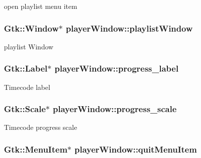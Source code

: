 open playlist menu item \hypertarget{classplayerWindow_a63e7618098364d24ddb947674414b843}{
\subsubsection[{playlist\-Window}]{\setlength{\rightskip}{0pt plus 5cm}Gtk\-::\-Window$\ast$ player\-Window\-::playlist\-Window\hspace{0.3cm}{\ttfamily [protected]}}}\label{classplayerWindow_a63e7618098364d24ddb947674414b843}
playlist Window \hypertarget{classplayerWindow_ae276969a34d7a21553c23ae17ca76eca}{
\subsubsection[{progress\-\_\-label}]{\setlength{\rightskip}{0pt plus 5cm}Gtk\-::\-Label$\ast$ player\-Window\-::progress\-\_\-label\hspace{0.3cm}{\ttfamily [protected]}}}\label{classplayerWindow_ae276969a34d7a21553c23ae17ca76eca}
Timecode label \hypertarget{classplayerWindow_a295a659d7e32496d0fc278afeed2f7d1}{
\subsubsection[{progress\-\_\-scale}]{\setlength{\rightskip}{0pt plus 5cm}Gtk\-::\-Scale$\ast$ player\-Window\-::progress\-\_\-scale\hspace{0.3cm}{\ttfamily [protected]}}}\label{classplayerWindow_a295a659d7e32496d0fc278afeed2f7d1}
Timecode progress scale \hypertarget{classplayerWindow_a8b0c945e5b9aa8c33f1eaaa1a53f79bc}{
\subsubsection[{quit\-Menu\-Item}]{\setlength{\rightskip}{0pt plus 5cm}Gtk\-::\-Menu\-Item$\ast$ player\-Window\-::quit\-Menu\-Item\hspace{0.3cm}{\ttfamily [protected]}}}\label{classplayerWindow_a8b0c945e5b9aa8c33f1eaaa1a53f79bc}
